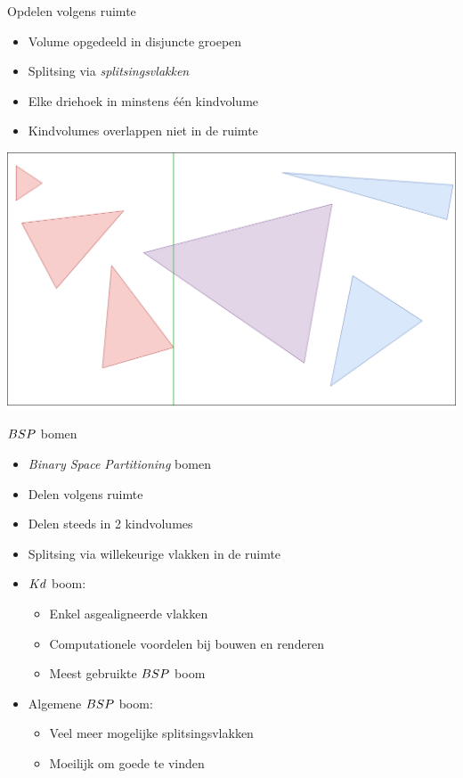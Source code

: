 \documentclass[11pt,t]{beamer}
\begin{document}
\begin{frame}{Opdelen volgens ruimte}
	\begin{itemize}
		\item Volume opgedeeld in disjuncte groepen
		\item Splitsing via \textit{splitsingsvlakken}
		\item Elke driehoek in minstens één kindvolume
		\item Kindvolumes overlappen niet in de ruimte
	\end{itemize}
	\pause
	\vspace{5pt}
	\hspace{20pt}
	\includegraphics[height=.4\paperheight]{../img/volumeSplit}
\end{frame}

\begin{frame}{$BSP$ bomen}
	\begin{itemize}
		\item \textit{Binary Space Partitioning} bomen
		\item Delen volgens ruimte
		\item Delen steeds in 2 kindvolumes
		\item Splitsing via willekeurige vlakken in de ruimte
		\item $Kd$ boom:
			\begin{itemize}
				\item Enkel asgealigneerde vlakken
				\item Computationele voordelen bij bouwen en renderen
				\item Meest gebruikte $BSP$ boom
			\end{itemize}
		\item Algemene $BSP$ boom:
			\begin{itemize}
				\item Veel meer mogelijke splitsingsvlakken
				\item Moeilijk om goede te vinden
			\end{itemize}			
	\end{itemize}
\end{frame}
\end{document}
